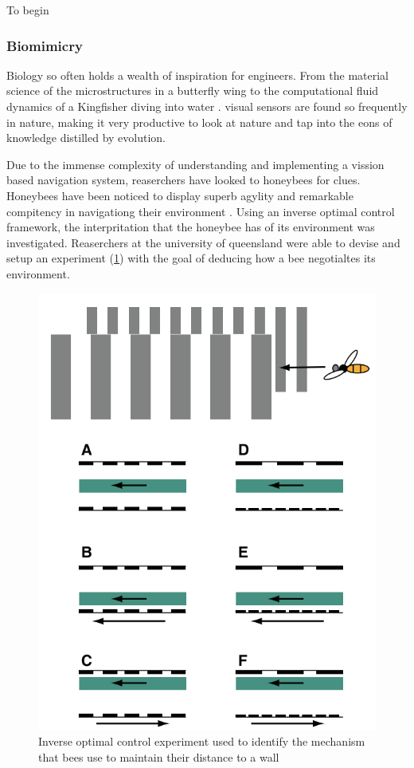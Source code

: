 \documentclass{UoNMCHA}
\numberwithin{equation}{section}
\begin{document}
To begin 

\subsubsection{Biomimicry}
Biology so often holds a wealth of inspiration for engineers. From the material science of the microstructures in a butterfly wing to the computational fluid dynamics of a Kingfisher diving into water \citep{benyus1997biomimicry}. visual sensors are found so frequently in nature, making it very productive to look at nature and tap into the eons of knowledge distilled by evolution.

Due to the immense complexity of understanding and implementing a vission based navigation system, reaserchers have looked to honeybees for clues. Honeybees have been noticed to display superb agylity and remarkable compitency in navigationg their environment \citep{srinivasan2012biology}. Using an inverse optimal control framework, the interpritation that the honeybee has of its environment was investigated. Reaserchers at the university of queensland were able to devise and setup an experiment (\cref{fig:BeeExperiment}) with the goal of deducing how a bee negotialtes its environment.

\begin{figure}[ht]
    \begin{center}
        \includegraphics[width=.6\linewidth]{Figures/beeExperiment}
        \caption{Inverse optimal control experiment used to identify the mechanism that bees use to maintain their distance to a wall}
        \label{fig:BeeExperiment}
    \end{center}
\end{figure}
\end{document}
